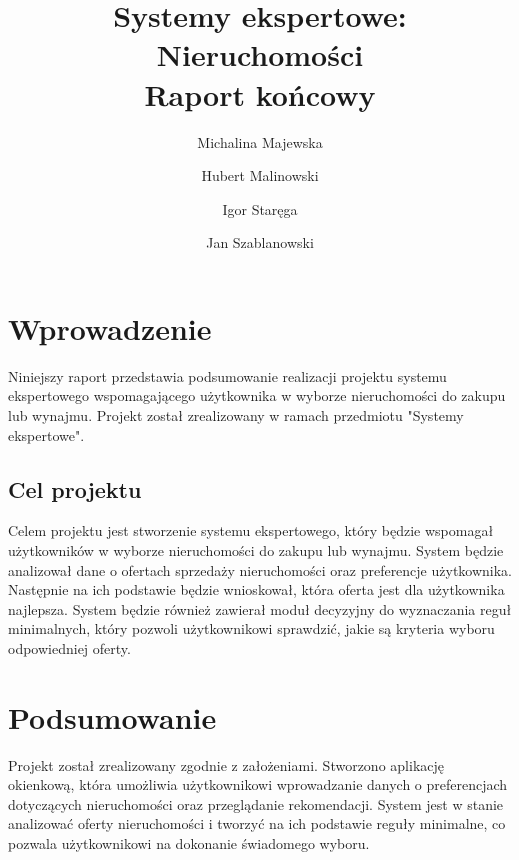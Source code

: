 \documentclass{article}
\title{Systemy ekspertowe: Nieruchomości \\ \large{Raport końcowy}}
\author{Michalina Majewska
	\and Hubert Malinowski
	\and Igor Staręga
	\and Jan Szablanowski}
\begin{document}
\maketitle
\tableofcontents

\vspace{2cm}
\newpage

\section{Wprowadzenie}

Niniejszy raport przedstawia podsumowanie realizacji projektu systemu ekspertowego wspomagającego użytkownika w wyborze nieruchomości do zakupu lub wynajmu. Projekt został zrealizowany w ramach przedmiotu "Systemy ekspertowe".

\subsection{Cel projektu}

Celem projektu jest stworzenie systemu ekspertowego, który będzie wspomagał użytkowników w wyborze nieruchomości do zakupu lub wynajmu. System będzie analizował dane o ofertach sprzedaży nieruchomości oraz preferencje użytkownika. Następnie na ich podstawie będzie wnioskował, która oferta jest dla użytkownika najlepsza. System będzie również zawierał moduł decyzyjny do wyznaczania reguł minimalnych, który pozwoli użytkownikowi sprawdzić, jakie są kryteria wyboru odpowiedniej oferty.






\section{Podsumowanie}
Projekt został zrealizowany zgodnie z założeniami. Stworzono aplikację okienkową, która umożliwia użytkownikowi wprowadzanie danych o preferencjach dotyczących nieruchomości oraz przeglądanie rekomendacji. System jest w stanie analizować oferty nieruchomości i tworzyć na ich podstawie reguły minimalne, co pozwala użytkownikowi na dokonanie świadomego wyboru.
\end{document}
